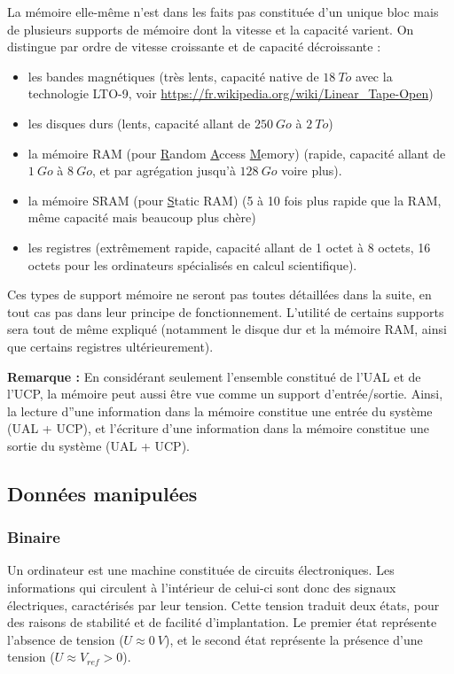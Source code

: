 \documentclass[../../main.tex]{subfiles}
\begin{document}
La mémoire elle-même n'est dans les faits pas constituée d'un unique bloc mais de plusieurs supports de mémoire dont la vitesse et la capacité varient. On distingue par ordre de vitesse croissante et de capacité décroissante :
\begin{itemize}
    \item les bandes magnétiques (très lents, capacité native de $18\ To$ avec la technologie LTO-9, voir \url{https://fr.wikipedia.org/wiki/Linear_Tape-Open})
    \item les disques durs (lents, capacité allant de $250\ Go$ à $2\ To$)
    \item la mémoire RAM (pour \underline{R}andom \underline{A}ccess \underline{M}emory) (rapide, capacité allant de $1\ Go$ à $8\ Go$, et par agrégation jusqu'à $128\ Go$ voire plus).
    \item la mémoire SRAM  (pour \underline{S}tatic RAM) (5 à 10 fois plus rapide que la RAM, même capacité mais beaucoup plus chère)
    \item les registres (extrêmement rapide, capacité allant de 1 octet à 8 octets, 16 octets pour les ordinateurs spécialisés en calcul scientifique).
\end{itemize}
Ces types de support mémoire ne seront pas toutes détaillées dans la suite, en tout cas pas dans leur principe de fonctionnement. L'utilité de certains supports sera tout de même expliqué (notamment le disque dur et la mémoire RAM, ainsi que certains registres ultérieurement).

\textbf{Remarque :} En considérant seulement l'ensemble constitué de l'UAL et de l'UCP, la mémoire peut aussi être vue comme un support d'entrée/sortie. Ainsi, la lecture d''une information dans la mémoire constitue une entrée du système (UAL + UCP), et l'écriture d'une information dans la mémoire constitue une sortie du système (UAL + UCP).
\subsection{Données manipulées}
\subsubsection{Binaire}
Un ordinateur est une machine constituée de circuits électroniques. Les informations qui circulent à l'intérieur de celui-ci sont donc des signaux électriques, caractérisés par leur tension. Cette tension traduit deux états, pour des raisons de stabilité et de facilité d'implantation. Le premier état représente l'absence de tension ($U \approx 0\ V$), et le second état représente la présence d'une tension ($U \approx V_{ref} > 0$).
\end{document}
